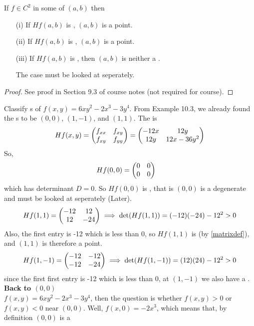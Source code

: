 \documentclass[english, 11pt]{article}
\begin{document}
\begin{thrm}\label{second-derivative test}
  If $f \in C^2$ in some  of  $(a,b)$ then
  \begin{itemize}
    \item[(i)] If $Hf(a,b)$ is , $(a,b)$ is a  point.
    \item[(ii)] If $Hf(a,b)$ is , $(a,b)$ is a  point.
    \item[(iii)] If $Hf(a,b)$ is , then $(a,b)$ is neither a .
    \begin{note}
      The  case must be looked at seperately.
    \end{note}
  \end{itemize}
\end{thrm}
\begin{proof}
  See proof in Section 9.3 of course notes (not required for course).
\end{proof}

\begin{exmp}
  Classify s of $f(x,y) = 6xy^2 - 2x^3 - 3y^4$. From Example 10.3, we already found the s to be $(0,0)$, $(1,-1)$, and $(1,1)$. The  is
  \[ Hf(x,y) = \left( \begin{matrix} f_{xx} & f_{xy} \\ f_{xy} & f_{yy} \end{matrix} \right) = \left( \begin{matrix} -12x & 12y \\ 12y & 12x - 36y^2 \end{matrix} \right) \]
  So,
  \begin{align*}
    Hf(0,0) & = \left( \begin{matrix} 0 & 0 \\ 0 & 0 \end{matrix} \right)
  \end{align*}
  which has determinant $D = 0$. So $Hf(0,0)$ is , that is $(0,0)$ is a degenerate  and must be looked at seperately (Later).
  \[ Hf(1,1) = \left( \begin{matrix} -12 & 12 \\ 12 & -24 \end{matrix} \right) \implies \det(Hf(1,1)) = (-12)(-24) - 12^2 > 0 \]
  Also, the first entry is -12 which is less than 0, so $Hf(1,1)$ is  (by \autoref{matrixdef}), and $(1,1)$ is therefore a  point.
  \[ Hf(1,-1) = \left( \begin{matrix} -12 & -12 \\ -12 & -24 \end{matrix} \right) \implies \det(Hf(1,-1)) = (12)(24) - 12^2 > 0 \]
  since the first first entry is -12 which is less than 0, at $(1,-1)$ we also have a .\\

  \textbf{Back to $(0,0)$} \\

  $f(x,y) = 6xy^2 - 2x^3 - 3y^4$, then the question is whether $f(x,y) > 0$ or $f(x,y) < 0$ near $(0,0)$. Well, $f(x,0) = -2x^3$, which means that, by definition $(0,0)$ is a 
\end{exmp}
\end{document}
